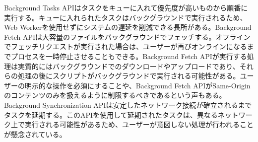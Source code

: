 Background Tasks APIはタスクをキューに入れて優先度が高いものから順番に実行する。キューに入れられたタスクはバックグラウンドで実行されるため、Web Workerを使用せずにシステムの遅延を削減できる長所がある。Background Fetch APIは大容量のファイルをバックグラウンドでフェッチする。オフラインでフェッチリクエストが実行された場合は、ユーザーが再びオンラインになるまでプロセスを一時停止させることもできる。Background Fetch APIが実行する処理は実質的にはバックグラウンドでのダウンロードやアップロードであり、それらの処理の後にスクリプトがバックグラウンドで実行される可能性がある。ユーザーの明示的な操作を必須にすることや、Background Fetch APIがSame-Originのコンテンツのみを扱えるように制限するべきであるという声もある。Background Synchronization APIは安定したネットワーク接続が確立されるまでタスクを延期する。このAPIを使用して延期されたタスクは、異なるネットワーク上で実行される可能性があるため、ユーザーが意図しない処理が行われることが懸念されている。
